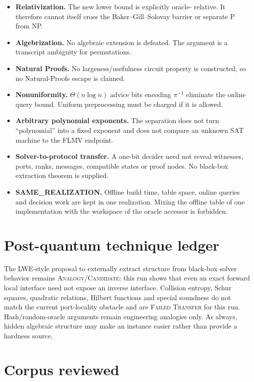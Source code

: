 \documentclass[11pt]{article}
\newcommand{\status}[1]{\textsc{#1}}
\begin{document}
\begin{itemize}[leftmargin=1.5em]
\item \textbf{Relativization.}  The new lower bound is explicitly oracle-
relative.  It therefore cannot itself cross the Baker--Gill--Solovay barrier
or separate P from NP.
\item \textbf{Algebrization.}  No algebraic extension is defeated.  The
argument is a transcript ambiguity for permutations.
\item \textbf{Natural Proofs.}  No largeness/usefulness circuit property is
constructed, so no Natural-Proofs escape is claimed.
\item \textbf{Nonuniformity.}  $\Theta(n\log n)$ advice bits encoding
$\pi^{-1}$ eliminate the online query bound.  Uniform preprocessing must be
charged if it is allowed.
\item \textbf{Arbitrary polynomial exponents.}  The separation does not
turn ``polynomial'' into a fixed exponent and does not compare an unknown SAT
machine to the FLMV endpoint.
\item \textbf{Solver-to-protocol transfer.}  A one-bit decider need not
reveal witnesses, ports, ranks, messages, compatible states or proof nodes.
No black-box extraction theorem is supplied.
\item \textbf{SAME\_REALIZATION.}  Offline build time, table space, online
queries and decision work are kept in one realization.  Mixing the offline
table of one implementation with the workspace of the oracle accessor is
forbidden.
\end{itemize}

\section{Post-quantum technique ledger}

The LWE-style proposal to externally extract structure from black-box solver
behavior remains \status{Analogy/Candidate}: this run shows that even an
exact forward local interface need not expose an inverse interface.  Collision
entropy, Schur squares, quadratic relations, Hilbert functions and special
soundness do not match the current port-locality obstacle and are
\status{Failed Transfer} for this run.  Hash/random-oracle arguments remain
engineering analogies only.  As always, hidden algebraic structure may make
an instance easier rather than provide a hardness source.

\section{Corpus reviewed}
\end{document}
